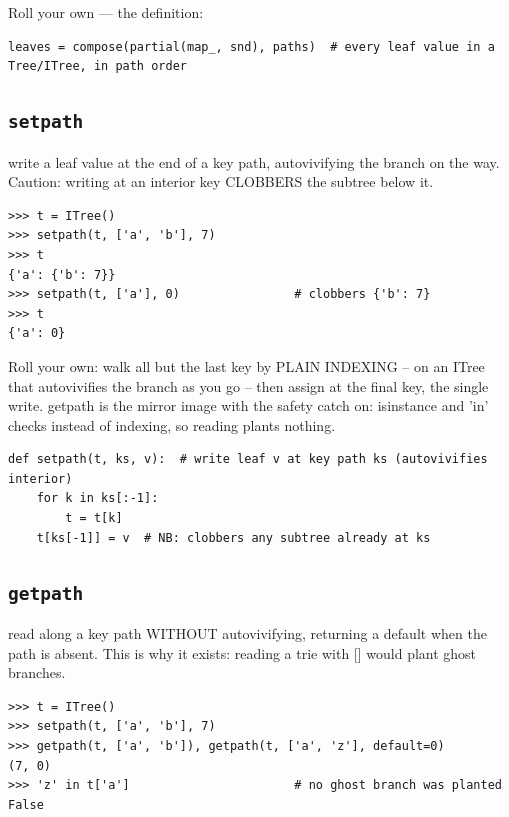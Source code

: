 \documentclass[10pt,letterpaper]{book}
\begin{document}
Roll your own --- the definition:

\begin{lstlisting}[style=ex]
leaves = compose(partial(map_, snd), paths)  # every leaf value in a Tree/ITree, in path order
\end{lstlisting}

\subsection{\texttt{setpath}}\label{def:setpath}
write a leaf value at the end of a key path, autovivifying the branch on the way. Caution: writing at an interior key CLOBBERS the subtree below it.
\begin{lstlisting}[style=ex]
>>> t = ITree()
>>> setpath(t, ['a', 'b'], 7)
>>> t
{'a': {'b': 7}}
>>> setpath(t, ['a'], 0)                # clobbers {'b': 7}
>>> t
{'a': 0}
\end{lstlisting}

Roll your own: walk all but the last key by PLAIN INDEXING -- on an ITree that autovivifies the branch as you go -- then assign at the final key, the single write. getpath is the mirror image with the safety catch on: isinstance and 'in' checks instead of indexing, so reading plants nothing.

\begin{lstlisting}[style=ex]
def setpath(t, ks, v):  # write leaf v at key path ks (autovivifies interior)
    for k in ks[:-1]:
        t = t[k]
    t[ks[-1]] = v  # NB: clobbers any subtree already at ks
\end{lstlisting}
\subsection{\texttt{getpath}}\label{def:getpath}
read along a key path WITHOUT autovivifying, returning a default when the path is absent. This is why it exists: reading a trie with [] would plant ghost branches.
\begin{lstlisting}[style=ex]
>>> t = ITree()
>>> setpath(t, ['a', 'b'], 7)
>>> getpath(t, ['a', 'b']), getpath(t, ['a', 'z'], default=0)
(7, 0)
>>> 'z' in t['a']                       # no ghost branch was planted
False
\end{lstlisting}
\end{document}
